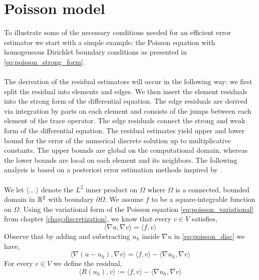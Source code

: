 \section{Poisson model} \label{section:error_poisson}
To illustrate some of the necessary conditions needed for an efficient error estimator we start with a simple example: the Poisson equation with homogeneous Dirichlet boundary conditions as presented in \eqref{eq:poisson_strong_form}.  
\\
\\
The derivation of the residual estimators will occur in the following way: we first split the residual into elements and edges. We then insert the element residuals into the strong form of the differential equation. The edge residuals are derived via integration by parts on each element and consists of the jumps between each element of the trace operator. The edge residuals connect the strong and weak form of the differential equation. The residual estimates yield upper and lower bound for the error of the numerical discrete solution up to multiplicative constants. The upper bounds are global on the computational domain, whereas the lower bounds are local on each element and its neighbors. The following analysis is based on a posteriori error estimation methods inspired by \cite{verfurth13, neittaanmaki, repin}.
\\
\\
We let $\langle .,.\rangle$ denote the $L^2$ inner product on $\Omega$ where $\Omega$ is a connected, bounded domain in $\mathbb{R}^2$ with boundary $\partial \Omega$. We assume $f$ to be a square-integrable function on $\Omega$. Using the variational form of the Poisson equation \eqref{eq:poisson_variational} from chapter \ref{chap:discretization}, we know that every $v \in V$ satisfies,
\begin{equation} \label{eq:poisson_disc}
\langle \nabla u, \nabla v \rangle = \langle f,v \rangle 
\end{equation}
Observe that by adding and substracting $u_h$ inside $\nabla u$ in \eqref{eq:poisson_disc} we have,
\begin{equation} \label{eq:poisson_residuala}
\langle \nabla (u-u_h), \nabla v \rangle =  \langle f,v \rangle - \langle \nabla u_h, \nabla v \rangle
\end{equation}
For every $v \in V$ we define the residual, 
\begin{equation} \label{eq:poisson_residual}
\langle R(u_h), v \rangle :=  \langle f,v \rangle - \langle \nabla u_h, \nabla v \rangle
\end{equation}
